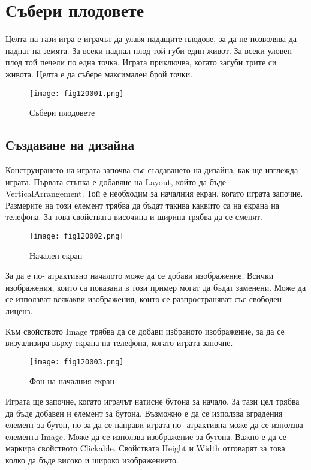 \chapter{Събери плодовете}

Целта на тази игра е играчът да улавя падащите плодове, за да не позволява да паднат на земята. За всеки паднал плод той губи един живот. За всеки уловен плод той печели по една точка. Играта приключва, когато загуби трите си живота. Целта е да събере максимален брой точки.

\begin{figure}[H]
  \centering
  \texttt{[image: fig120001.png]}
  \caption{Събери плодовете}
\label{fig120001}
\end{figure}

\section{Създаване на дизайна}
Конструирането на играта започва със създаването на дизайна, как ще изглежда играта. Първата стъпка е добавяне на Layout, който да бъде VerticalArrangement. Той е необходим за началния екран, когато играта започне. Размерите на този елемент трябва да бъдат такива каквито са на екрана на телефона. За това свойствата височина и ширина трябва да се сменят.

\begin{figure}[H]
  \centering
  \texttt{[image: fig120002.png]}
  \caption{Начален екран}
\label{fig120002}
\end{figure}

За да е по- атрактивно началото може да се добави изображение. Всички изображения, които са показани в този пример могат да бъдат заменени. Може да се използват всякакви изображения, които се разпространяват със свободен лиценз.

Към свойството Image трябва да се добави избраното изображение, за да се визуализира върху екрана на телефона, когато играта започне.

\begin{figure}[H]
  \centering
  \texttt{[image: fig120003.png]}
  \caption{Фон на началния екран}
\label{fig120003}
\end{figure}

Играта ще започне, когато играчът натисне бутона за начало. За тази цел трябва да бъде добавен и елемент за бутона. Възможно е да се използва вградения елемент за бутон, но за да се направи играта по- атрактивна може да се използва елемента Image. Може да се използва изображение за бутона. Важно е да се маркира свойството Clickable. Свойствата Height и Width отговарят за това колко да бъде високо и широко изображението.

